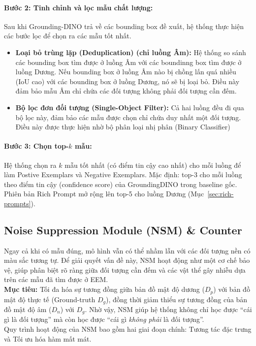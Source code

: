 \documentclass[a4paper,12pt]{report}
\numberwithin{figure}{chapter}
\numberwithin{table}{chapter}
\begin{document}
\paragraph{Bước 2: Tinh chỉnh và lọc mẫu chất lượng:} Sau khi Grounding-DINO trả về các bounding box đề xuất, hệ thống thực hiện các bước lọc để chọn ra các mẫu tốt nhất.
\begin{itemize}
    \item \textbf{Loại bỏ trùng lặp (Deduplication) (chỉ luồng Âm):} Hệ thống so sánh các bounding box tìm được ở luồng Âm với các boundinng box tìm được ở luồng Dương. Nếu bounding box ở luồng Âm nào bị chồng lấn quá nhiều (IoU cao) với các bounding box ở luồng Dương, nó sẽ bị loại bỏ. Điều này đảm bảo mẫu Âm chỉ chứa các đối tượng không phải đối tượng cần đếm.
    \item \textbf{Bộ lọc đơn đối tượng (Single-Object Filter):} Cả hai luồng đều đi qua bộ lọc này, đảm bảo các mẫu được chọn chỉ chứa duy nhất một đối tượng. Điều này được thực hiện nhờ bộ phân loại nhị phân (Binary Classifier)
\end{itemize}

\paragraph{Bước 3: Chọn top-$k$ mẫu:} Hệ thống chọn ra $k$ mẫu tốt nhất (có điểm tin cậy cao nhất) cho mỗi luồng để làm Postive Exemplars và Negative Exemplars. Mặc định: top-3 cho mỗi luồng theo điểm tin cậy (confidence score) của GroundingDINO trong baseline gốc. Phiên bản Rich Prompt mở rộng lên top-5 cho luồng Dương (Mục~\ref{sec:rich-prompts}).

\subsection{Noise Suppression Module (NSM) \& Counter}
\label{subsec:nsm}
Ngay cả khi có mẫu đúng, mô hình vẫn có thể nhầm lẫn với các đối tượng nền có màu sắc tương tự. Để giải quyết vấn đề này, NSM hoạt động như một cơ chế bảo vệ, giúp phân biệt rõ ràng giữa đối tượng cần đếm và các vật thể gây nhiễu dựa trên các mẫu đã tìm được ở EEM.\\[1em]
\textbf{Mục tiêu:} Tối đa hóa sự tương đồng giữa bản đồ mật độ dương ($D_p$) với bản đồ mật độ thực tế (Ground-truth $D_g$), đồng thời giảm thiểu sự tương đồng của bản đồ mật độ âm ($D_n$) với $D_g$. Nhờ vậy, NSM giúp hệ thống không chỉ học được ``cái gì là đối tượng'' mà còn học được ``cái gì \emph{không phải} là đối tượng''.\\[1em]
Quy trình hoạt động của NSM bao gồm hai giai đoạn chính: Tương tác đặc trưng và Tối ưu hóa hàm mất mát.
\end{document}
